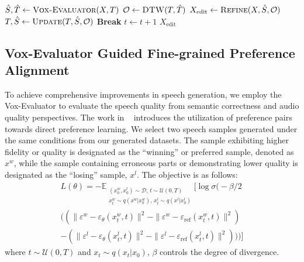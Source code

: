 \documentclass[letterpaper]{article} %
\begin{document}
\begin{algorithm}[t]
\caption{A pseudo-code of speech correction.}
\label{alg:sc}
\begin{algorithmic}[1]
    \State $\hat{S}, \hat{T} \gets \Call{Vox-Evaluator}{X, T}$
    \State $\mathcal{O} \gets \Call{DTW}{T, \hat{T}}$ 
    \State $X_{\text{edit}} \gets \Call{Refine}{X, \hat{S}, \mathcal{O}}$
      \State $T, \hat{S} \gets \Call{Update}{T, \hat{S}, \mathcal{O}}$
    \Else
      \textbf{ Break}
    \EndIf
    \State $t \gets t + 1$
    \EndWhile
    \State \Return $X_{\text{edit}}$
\EndFunction
\end{algorithmic}
\end{algorithm}


\subsection{Vox-Evaluator Guided Fine-grained Preference Alignment}
To achieve comprehensive improvements in speech generation, we employ the Vox-Evaluator to evaluate the speech quality from semantic correctness and audio quality perspectives. 
The work in ~\cite{zhang2025advancing} introduces the utilization of preference pairs towards direct preference learning. 
We select two speech samples generated under the same conditions from our generated datasets. The sample exhibiting higher fidelity or quality is designated as the ``winning'' or preferred sample, denoted as $x^w$, while the sample containing erroneous parts or demonstrating lower quality is designated as the ``losing'' sample, $x^l$. The objective is as follows: 
\begin{multline}
L(\theta) = -\mathbb{E}_{\substack{
    (x^w_0, x^l_0) \sim \mathcal{D}, \, t \sim \mathcal{U}(0,T) \\
    x^w_t \sim q(x^w | x^w_0), \, x^l_t \sim q(x^l | x^l_0)
}}
\Biggl[ \log \sigma \Biggl( -\beta/2 \\
\Big( ( \| \varepsilon^w - \varepsilon_\theta (x^w_t, t) \|^2 - \| \varepsilon^w - \varepsilon_{\text{ref}} (x^w_t, t) \|^2 ) \\
- ( \| \varepsilon^l - \varepsilon_\theta (x^l_t, t) \|^2 - \| \varepsilon^l - \varepsilon_{\text{ref}} (x^l_t, t) \|^2 ) \Big) \Biggr) \Biggr]
\end{multline}
where \( t \sim \mathcal{U}(0, T) \) and \( x_t \sim q(x_t | x_0) \), \( \beta \) controls the degree of divergence.
\end{document}
